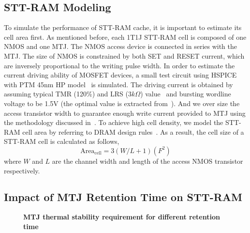 \subsection{STT-RAM Modeling}
To simulate the performance of STT-RAM cache, it is important to estimate its cell area first. As mentioned before, each 1T1J STT-RAM cell is composed of one NMOS and one MTJ. The NMOS access device is connected in series with the MTJ. The size of NMOS is constrained by both SET and RESET current, which are inversely proportional to the writing pulse width. In order to estimate the current driving ability of MOSFET devices, a small test circuit using HSPICE with PTM 45nm HP model~\cite{PTM} is simulated. The driving current is obtained by assuming typical TMR (120\%) and LRS ($3k\Omega$) value~\cite{STTRAM:Qualcomm09} and bursting wordline voltage to be 1.5V (the optimal value is extracted from~\cite{STTRAM:Gatech10}). And we over size the access transistor width to guarantee enough write current provided to MTJ using the methodology discussed in~\cite{STTRAM:RPI10}. To achieve high cell density, we model the STT-RAM cell area by referring to DRAM design rules~\cite{DRAM:6F2}.  As a result, the cell size of a STT-RAM cell is calculated as follows,
\begin{equation}
\mathrm{Area}_{\mathrm{cell}}={3\left(W/L+1\right)}(F^2)
\end{equation}
where $W$ and $L$ are the channel width and length of the access NMOS transistor respectively.

\subsection{Impact of MTJ Retention Time on STT-RAM} \label{subsec:retention}
\begin{wrapfigure}{l}{0.50\textwidth}
\centering
  \caption{\label{fig:retention} \scriptsize \bf MTJ thermal stability requirement for different retention time}
\end{wrapfigure}


